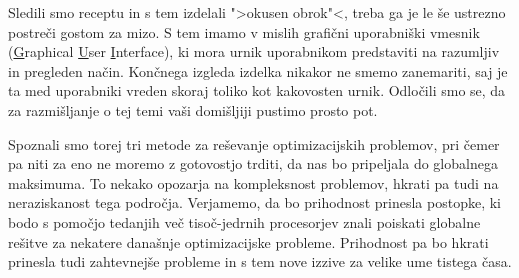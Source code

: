 \documentclass[a4paper,10pt]{article}
\begin{document}
Sledili smo receptu in s tem izdelali ">okusen obrok"<, treba ga je le še ustrezno postreči
gostom za mizo. S tem imamo v mislih grafični uporabniški vmesnik (\underline{G}raphical
\underline{U}ser \underline{I}nterface), ki mora urnik uporabnikom predstaviti na razumljiv in
pregleden način. Končnega izgleda izdelka nikakor ne smemo zanemariti, saj je ta med uporabniki
vreden skoraj toliko kot kakovosten urnik. Odločili smo se, da za razmišljanje o tej temi vaši
domišljiji pustimo prosto pot.

Spoznali smo torej tri metode za reševanje optimizacijskih problemov, pri čemer pa niti za eno
ne moremo z gotovostjo trditi, da nas bo pripeljala do globalnega maksimuma. To nekako opozarja
na kompleksnost problemov, hkrati pa tudi na neraziskanost tega področja. Verjamemo, da bo
prihodnost prinesla postopke, ki bodo s pomočjo tedanjih več tisoč-jedrnih procesorjev znali
poiskati globalne rešitve za nekatere današnje optimizacijske probleme. Prihodnost pa bo
hkrati prinesla tudi zahtevnejše probleme in s tem nove izzive za velike ume tistega časa.
\end{document}
